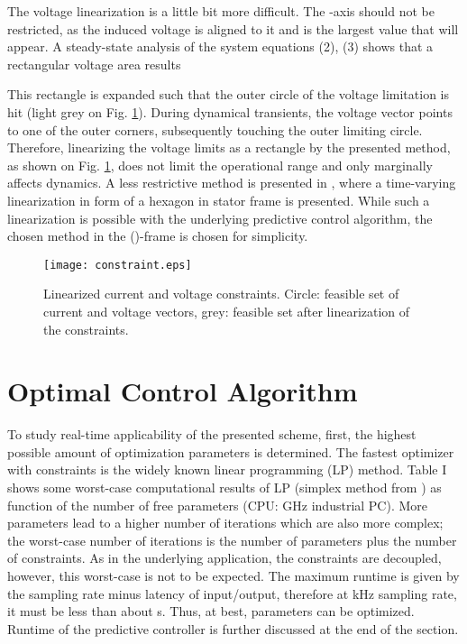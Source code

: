 \documentclass[a4paper,11pt,fleqn]{article}
\begin{document}
The voltage linearization is a little bit more difficult. The -axis should not be restricted, as the induced voltage is aligned to it and is the largest value that will appear. A steady-state analysis of the system equations (2), (3) shows that a rectangular voltage area results

This rectangle is expanded such that the outer circle of the voltage limitation is hit (light grey on Fig. \ref{fig:constraints}). During dynamical transients, the voltage vector points to one of the outer corners, subsequently touching the outer limiting circle. Therefore, linearizing the voltage limits as a rectangle by the presented method, as shown on Fig. \ref{fig:constraints}, does not limit the operational range and only marginally affects dynamics. A less restrictive method is presented in \cite{onlineMPC}, where a time-varying linearization in form of a hexagon in stator frame is presented. While such a linearization is possible with the underlying predictive control algorithm, the chosen method in the ()-frame is chosen for simplicity.


\begin{figure}[!ht]
  \centering
  \texttt{[image: constraint.eps]}
  \caption{Linearized current and voltage constraints. Circle: feasible set of current and voltage vectors, grey: feasible set after linearization of the constraints.\label{fig:constraints}}
\end{figure}











\section*{Optimal Control Algorithm}

To study real-time applicability of the presented scheme, first, the highest possible amount of optimization parameters is determined. The fastest optimizer with constraints is the widely known linear programming (LP) method. Table I shows some worst-case computational results of LP (simplex method from \cite{LPalg}) as function of the number of free parameters (CPU:  GHz industrial PC). More parameters lead to a higher number of iterations which are also more complex; the worst-case number of iterations is the number of parameters plus the number of constraints. As in the underlying application, the constraints are decoupled, however, this worst-case is not to be expected. The maximum runtime is given by the sampling rate minus latency of input/output, therefore at  kHz sampling rate, it must be less than about  s. Thus, at best,  parameters can be optimized. Runtime of the predictive controller is further discussed at the end of the section.
\end{document}
